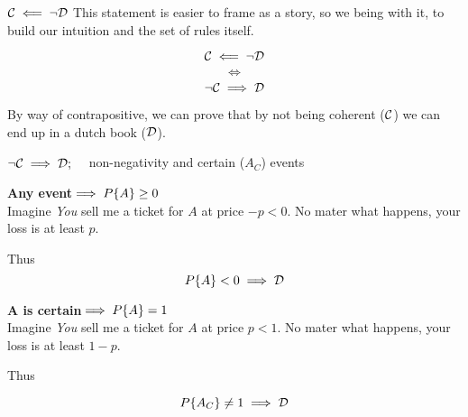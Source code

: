 \begin{frame}{$\mathcal{C}\impliedby\neg\mathcal{D}$}
This statement is easier to frame as a story, so we being with it, to build our intuition and the set of rules itself.

$$\mathcal{C}\impliedby\neg\mathcal{D}$$
$$\iff$$
$$\neg\mathcal{C}\implies\mathcal{D}$$

By way of contrapositive, we can prove that by not being coherent ($\mathcal{C}$) we can end up in a dutch book ($\mathcal{D}$).
\end{frame}

\begin{frame}{$\neg\mathcal{C}\implies\mathcal{D};\quad$ non-negativity and certain ($A_{C}$) events}


\begin{minipage}[]{\linewidth}
\begin{minipage}[]{0.45\linewidth}
{\textbf{Any event$\implies P\{A\}\ge0$}}
 \\
Imagine \emph{You} sell me a ticket for $A$ at price $-p<0$. No mater what happens, your loss is at least $p$.

Thus
$$P\{A\}<0\implies\mathcal{D}$$
\end{minipage}
\hfill
\begin{minipage}[]{0.45\linewidth}
{\centering\textbf{A is certain$\implies P\{A\}=1$}}
 \\
Imagine \emph{You} sell me a ticket for $A$ at price $p<1$. No mater what happens, your loss is at least $1-p$.

Thus

$$P\{A_{C}\}\ne1\implies\mathcal{D}$$

\end{minipage}



\end{minipage}

\end{frame}

